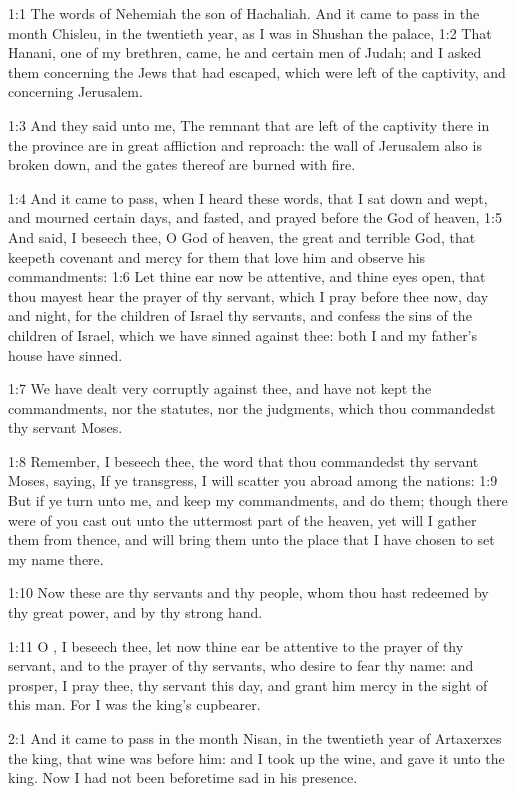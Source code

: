 

1:1 The words of Nehemiah the son of Hachaliah. And it came to pass in the month Chisleu, in the twentieth year, as I was in Shushan the palace, 1:2 That Hanani, one of my brethren, came, he and certain men of Judah; and I asked them concerning the Jews that had escaped, which were left of the captivity, and concerning Jerusalem.

1:3 And they said unto me, The remnant that are left of the captivity there in the province are in great affliction and reproach: the wall of Jerusalem also is broken down, and the gates thereof are burned with fire.

1:4 And it came to pass, when I heard these words, that I sat down and wept, and mourned certain days, and fasted, and prayed before the God of heaven, 1:5 And said, I beseech thee, O \LORD God of heaven, the great and terrible God, that keepeth covenant and mercy for them that love him and observe his commandments: 1:6 Let thine ear now be attentive, and thine eyes open, that thou mayest hear the prayer of thy servant, which I pray before thee now, day and night, for the children of Israel thy servants, and confess the sins of the children of Israel, which we have sinned against thee: both I and my father's house have sinned.

1:7 We have dealt very corruptly against thee, and have not kept the commandments, nor the statutes, nor the judgments, which thou commandedst thy servant Moses.

1:8 Remember, I beseech thee, the word that thou commandedst thy servant Moses, saying, If ye transgress, I will scatter you abroad among the nations: 1:9 But if ye turn unto me, and keep my commandments, and do them; though there were of you cast out unto the uttermost part of the heaven, yet will I gather them from thence, and will bring them unto the place that I have chosen to set my name there.

1:10 Now these are thy servants and thy people, whom thou hast redeemed by thy great power, and by thy strong hand.

1:11 O \LORD, I beseech thee, let now thine ear be attentive to the prayer of thy servant, and to the prayer of thy servants, who desire to fear thy name: and prosper, I pray thee, thy servant this day, and grant him mercy in the sight of this man. For I was the king's cupbearer.

2:1 And it came to pass in the month Nisan, in the twentieth year of Artaxerxes the king, that wine was before him: and I took up the wine, and gave it unto the king. Now I had not been beforetime sad in his presence.

